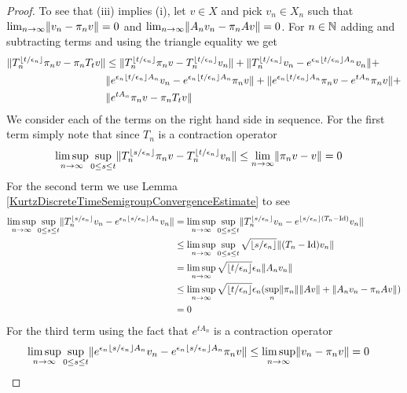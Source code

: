 \begin{proof}
To see that (iii) implies (i), let $v \in X$ and pick $v_n \in X_n$ such that $\lim_{n \to \infty} \lVert v_n - \pi_n v \rVert = 0$ and $\lim_{n \to \infty} \lVert A_n v_n - \pi_n A v \rVert = 0$.  For
$n \in \mathbb{N}$ adding and subtracting terms and using the triangle equality we get
\begin{align*}
\lVert T^{\lfloor t/\epsilon_n \rfloor}_n \pi_n v - \pi_n T_t v \rVert 
&\leq \lVert T^{\lfloor t/\epsilon_n \rfloor}_n \pi_n v - T^{\lfloor t/\epsilon_n \rfloor}_n v_n \rVert  + 
\lVert T^{\lfloor t/\epsilon_n \rfloor}_n v_n - e^{\epsilon_n \lfloor t/\epsilon_n \rfloor A_n} v_n \rVert + \\
&\lVert e^{\epsilon_n \lfloor t/\epsilon_n \rfloor A_n} v_n - e^{\epsilon_n \lfloor t/\epsilon_n \rfloor A_n} \pi_n v \rVert + 
\lVert e^{\epsilon_n \lfloor t/\epsilon_n \rfloor A_n} \pi_n v - e^{t A_n} \pi_n v \rVert + \\
&\lVert e^{t A_n} \pi_n v - \pi_n T_t v \rVert
\end{align*}
We consider each of the terms on the right hand side in sequence.  For the first term simply note that since $T_n$ is a contraction operator
\begin{align*}
\limsup_{n \to \infty} \sup_{0 \leq s \leq t} \lVert T^{\lfloor s/\epsilon_n \rfloor}_n \pi_n v - T^{\lfloor t/\epsilon_n \rfloor}_n v_n \rVert &\leq \lim_{n \to \infty} \lVert \pi_n v - v \rVert = 0
\end{align*}
For the second term we use Lemma \ref{KurtzDiscreteTimeSemigroupConvergenceEstimate} to see 
\begin{align*}
\limsup_{n \to \infty} \sup_{0 \leq s \leq t} \lVert T^{\lfloor s/\epsilon_n \rfloor}_n v_n - e^{\epsilon_n \lfloor s/\epsilon_n \rfloor A_n} v_n \rVert 
&=\limsup_{n \to \infty} \sup_{0 \leq s \leq t} \lVert T^{\lfloor s/\epsilon_n \rfloor}_n v_n - e^{\lfloor s/\epsilon_n \rfloor (T_n- \operatorname*{Id})} v_n \rVert  \\
&\leq \limsup_{n \to \infty} \sup_{0 \leq s \leq t} \sqrt{\lfloor s/\epsilon_n \rfloor} \lVert (T_n- \operatorname*{Id}) v_n \rVert \\
&= \limsup_{n \to \infty} \sqrt{\lfloor t/\epsilon_n \rfloor} \epsilon_n \lVert A_n v_n \rVert \\
&\leq \limsup_{n \to \infty} \sqrt{\lfloor t/\epsilon_n \rfloor} \epsilon_n (\sup_n \lVert \pi_n \rVert \lVert A v \rVert  + \lVert A_n v_n - \pi_n A v \rVert) \\
&= 0
\end{align*}
For the third term using the fact that $e^{tA_n}$ is a contraction operator 
\begin{align*}
\limsup_{n \to \infty} \sup_{0 \leq s \leq t}\norm{e^{\epsilon_n \floor{s/\epsilon_n} A_n} v_n - e^{\epsilon_n \floor{s/\epsilon_n} A_n} \pi_n v}
&\leq \limsup_{n \to \infty} \norm{v_n -\pi_n v} =0

\end{align*}
\end{proof}
